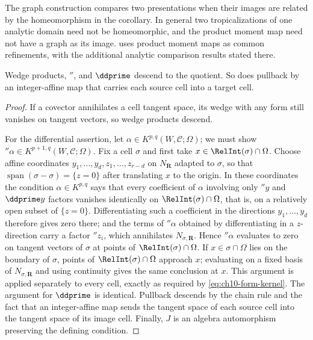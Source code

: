 The graph construction compares two presentations when their images are
related by the homeomorphism in the corollary. In general two
tropicalizations of one analytic domain need not be homeomorphic, and the
product moment map need not have a graph as its image.
 uses product moment maps as common
refinements, with the additional analytic comparison results stated there.

\begin{proposition}
\label{prop:ch10-forms-quotient-operations}
Wedge products, $\dprime$, and $\ddprime$ descend to the quotient.  So does
pullback by an integer-affine map that carries each source cell into a target
cell.
\end{proposition}
\begin{proof}
If a covector annihilates a cell tangent space, its wedge with any form still
vanishes on tangent vectors, so wedge products descend.

For the differential assertion, let
$\alpha\in K^{p,q}(W,\mathscr C;\Omega)$; we must show
$\dprime\alpha\in K^{p+1,q}(W,\mathscr C;\Omega)$.  Fix a cell $\sigma$ and
first take $x\in\RelInt(\sigma)\cap\Omega$.  Choose affine coordinates
$y_1,\ldots,y_d,z_1,\ldots,z_{r-d}$ on $N_{\mathbf R}$ adapted to $\sigma$,
so that $\operatorname{span}(\sigma-\sigma)=\{z=0\}$ after translating $x$ to
the origin.  In these coordinates the condition $\alpha\in K^{p,q}$ says that
every coefficient of $\alpha$ involving only $\dprime y$ and $\ddprime y$
factors vanishes identically on $\RelInt(\sigma)\cap\Omega$, that is, on a
relatively open subset of $\{z=0\}$.  Differentiating such a coefficient in
the directions $y_1,\ldots,y_d$ therefore gives zero there; and the terms of
$\dprime\alpha$ obtained by differentiating in a $z$-direction carry a factor
$\dprime z_i$, which annihilates $N_{\sigma,\mathbf R}$.  Hence
$\dprime\alpha$ evaluates to zero on tangent vectors of $\sigma$ at points of
$\RelInt(\sigma)\cap\Omega$.  If $x\in\sigma\cap\Omega$ lies on the boundary
of $\sigma$, points of $\RelInt(\sigma)\cap\Omega$ approach $x$; evaluating
on a fixed basis of $N_{\sigma,\mathbf R}$ and using continuity gives the
same conclusion at $x$.  This argument is applied separately to every cell,
exactly as required by \eqref{eq:ch10-form-kernel}.  The argument for
$\ddprime$ is identical.  Pullback descends by the chain rule and the fact
that an integer-affine map sends the tangent space of each source cell into
the tangent space of its image cell.  Finally, $J$ is an algebra
automorphism preserving the defining condition.
\end{proof}

